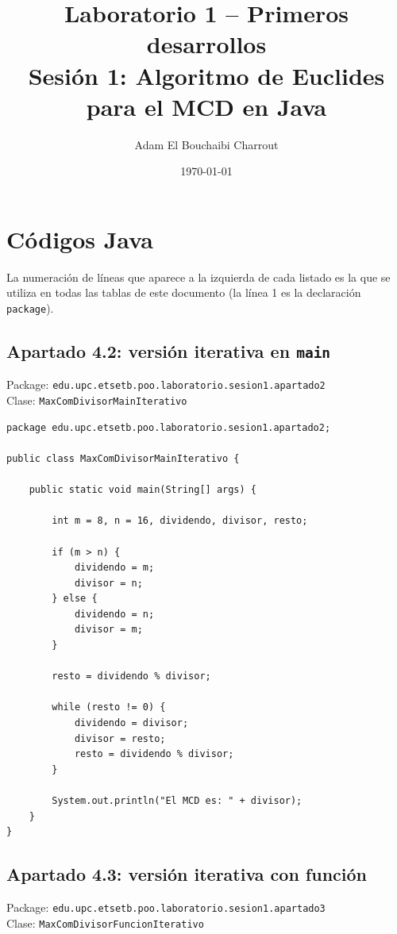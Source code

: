 \documentclass[11pt,a4paper]{article}
\title{Laboratorio 1 -- Primeros desarrollos\\
\large Sesión 1: Algoritmo de Euclides para el MCD en Java}
\author{Adam El Bouchaibi Charrout}
\date{\today}
\begin{document}
\maketitle
\tableofcontents
\newpage

\section{Códigos Java}
La numeración de líneas que aparece a la izquierda de cada listado es la que se utiliza en todas las tablas de este documento (la línea 1 es la declaración \texttt{package}).

\subsection{Apartado 4.2: versión iterativa en \texttt{main}}
Package: \texttt{edu.upc.etsetb.poo.laboratorio.sesion1.apartado2}\\
Clase: \texttt{MaxComDivisorMainIterativo}

\begin{lstlisting}
package edu.upc.etsetb.poo.laboratorio.sesion1.apartado2;

public class MaxComDivisorMainIterativo {

    public static void main(String[] args) {

        int m = 8, n = 16, dividendo, divisor, resto;

        if (m > n) {
            dividendo = m;
            divisor = n;
        } else {
            dividendo = n;
            divisor = m;
        }

        resto = dividendo % divisor;

        while (resto != 0) {
            dividendo = divisor;
            divisor = resto;
            resto = dividendo % divisor;
        }

        System.out.println("El MCD es: " + divisor);
    }
}
\end{lstlisting}

\subsection{Apartado 4.3: versión iterativa con función}
Package: \texttt{edu.upc.etsetb.poo.laboratorio.sesion1.apartado3}\\
Clase: \texttt{MaxComDivisorFuncionIterativo}
\end{document}
